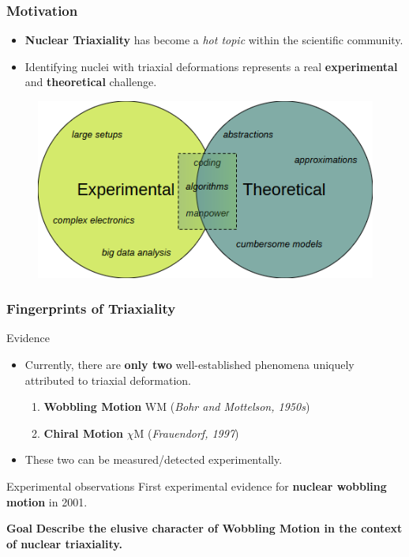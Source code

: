 \documentclass{beamer}
\begin{document}
\begin{frame}
	\frametitle{Motivation}
    \vspace{-0.3cm}
    \begin{itemize}
        \item \textbf{Nuclear Triaxiality} has become a \emph{hot topic} within the scientific community.
        \item Identifying nuclei with triaxial deformations represents a real \textbf{experimental} and \textbf{theoretical} challenge.
    \end{itemize}
    \vspace{-0.2cm}
    \begin{figure}
        \centering
        \includegraphics[scale=0.7]{figures/exp_vs_theory.png}
    \end{figure}
\end{frame}

\begin{frame}
	\frametitle{Fingerprints of Triaxiality}
	\begin{block}{Evidence \faSearch}
		\begin{itemize}
			\item Currently, there are \textbf{only two} well-established phenomena uniquely attributed to triaxial deformation.
			\begin{enumerate}
				\item \textbf{Wobbling Motion} WM (\emph{Bohr and Mottelson, 1950s})
				\item \textbf{Chiral Motion} $\chi$M (\emph{Frauendorf, 1997})
			\end{enumerate}
			\item These two can be measured/detected experimentally.
		\end{itemize}
	\end{block}
	\begin{alertblock}{Experimental observations \faSearch}
		First experimental evidence for \textbf{nuclear wobbling motion} in 2001.
	\end{alertblock}
	\begin{exampleblock}{\textbf{Goal} \faClipboard}
		\textbf{Describe the elusive character of Wobbling Motion in the context of nuclear triaxiality.}
	\end{exampleblock}
\end{frame}
\end{document}
